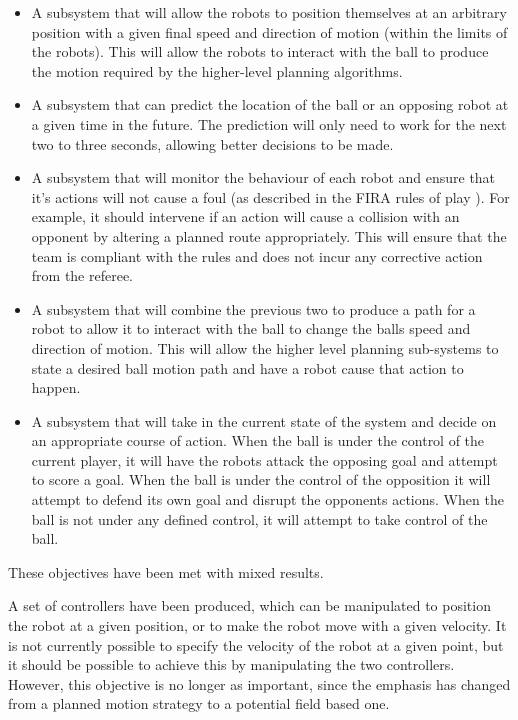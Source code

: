 \documentclass[10pt]{article}
\begin{document}
\begin{itemize}
\item A subsystem that will allow the robots to position themselves at an 
arbitrary position with a given final speed and direction of motion (within the
limits of the robots).  This will allow the robots to interact with the ball to 
produce the motion required by the higher-level planning algorithms.

\item A subsystem that can predict the location of the ball or an opposing robot 
at a given time in the future.  The prediction will only need to work for the 
next two to three seconds, allowing better decisions to be made.

\item A subsystem that will monitor the behaviour of each robot and ensure that 
it's actions will not cause a foul (as described in the \ac{FIRA} rules of play 
\cite{simurosotSim}).  For example, it should intervene if an action will cause 
a collision with an opponent by altering a planned route appropriately.  This 
will ensure that the team is compliant with the rules and does not incur any 
corrective action from the referee.

\item A subsystem that will combine the previous two to produce a path for a 
robot to allow it to interact with the ball to change the balls speed and 
direction of motion.  This will allow the higher level planning sub-systems 
to state a desired ball motion path and have a robot cause that action to 
happen.

\item A subsystem that will take in the current state of the system and decide 
on an appropriate course of action. When the ball is under the control of the 
current player, it will have the robots attack the opposing goal and attempt to 
score a goal.  When the ball is under the control of the opposition it will 
attempt to defend its own goal and disrupt the opponents actions. When the ball 
is not under any defined control, it will attempt to take control of the ball.
\end{itemize}

\cite{pplr}

These objectives have been met with mixed results.

A set of controllers have been produced, which can be manipulated to position
the robot at a given position, or to make the robot move with a given velocity. 
It is not currently possible to specify the velocity of the robot at a given
point, but it should be possible to achieve this by manipulating the two
controllers.  However, this objective is no longer as important, since the
emphasis has changed from a planned motion strategy to a potential field based
one.
\end{document}
